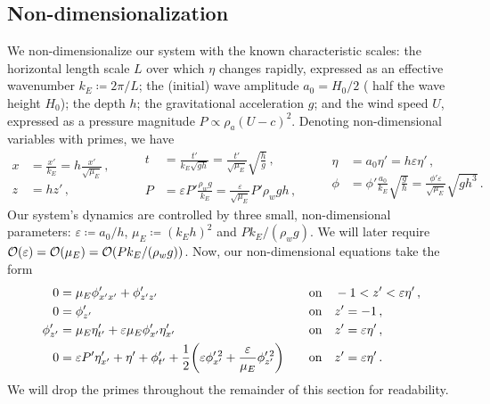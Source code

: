 \documentclass{jfm}
\renewcommand*{\epsilon}{\varepsilon}
\begin{document}
\subsection{\label{sec:nondim} Non-dimensionalization}
We non-dimensionalize our system with the known characteristic
scales: the horizontal length scale $L$ over which $\eta$ changes
rapidly, expressed as an effective wavenumber $k_E \coloneqq 2 \pi/L$;
the (initial) wave amplitude $a_0 = H_0/2$ (\ie{} half the wave height
$H_0$); the depth $h$; the gravitational acceleration $g$; and the wind
speed $U$, expressed as a pressure magnitude $P \propto \rho_a (U-c)^2$.
Denoting non-dimensional variables with primes, we have
\begin{equation}
  \begin{aligned}
  x &= \frac{x'}{k_E} = h \frac{x'}{\sqrt{\mu_E}}\,, \\
  z &= h z' \,,
  \end{aligned}
  \qquad
  \begin{aligned}
  t &= \frac{t'}{k_E\sqrt{g h}}
    = \frac{t'}{\sqrt{\mu_E}} \sqrt{\frac{h}{g}} \,, \\
  P &= \epsilon P' \frac{\rho_w g}{k_E}
    = \frac{\epsilon}{\sqrt{\mu_E}} P' \rho_w g h \,,
  \end{aligned}
  \qquad
  \begin{aligned}
  \eta &= a_0 \eta' = h \epsilon \eta' \,, \\
  \phi &= \phi'\frac{a_0}{k_E}\sqrt{\frac{g}{h}}
    = \frac{\phi'\epsilon}{\sqrt{\mu_E}}\sqrt{g h^3} \,.
  \end{aligned}
\end{equation}
Our system's dynamics are controlled by three small, non-dimensional
parameters: $\epsilon \coloneqq a_0/h$, $\mu_E \coloneqq (k_E h)^2$ and
$P k_E/(\rho_w g)$.
We will later require $\order{\epsilon} = \order{\mu_E} =
\order{Pk_E/(\rho_w g)}$.
Now, our non-dimensional equations take the form
\begin{alignat}{2}
  0 &= \mu_E \phi'_{x'x'} + \phi'_{z'z'} &&\qq{on}
    -1 < z' < \epsilon \eta' \,, \label{eq:laplace_nondim} \\
  0 &= \phi'_{z'} &&\qq{on} z'=-1 \,, \label{eq:bottom_bc_nondim} \\
  \phi'_{z'} &= \mu_E \eta'_{t'} +
    \epsilon \mu_E \phi'_{x'} \eta'_{x'} &&\qq{on} z' = \epsilon \eta' \,,
    \label{eq:kinematic_bc_nondim} \\
  0 &= \epsilon P' \eta'_{x'} +  \eta' + \phi'_{t'} + \frac{1}{2}
    \pqty{\epsilon \phi_{x'}^{\prime \, 2} + \frac{\epsilon}{\mu_E}
    \phi_{z'}^{\prime \, 2}} &&\qq{on} z'= \epsilon \eta' \,.
    \label{eq:dynamic_bc_nondim}
\end{alignat}
We will drop the primes throughout the remainder of this section for readability.
\end{document}
